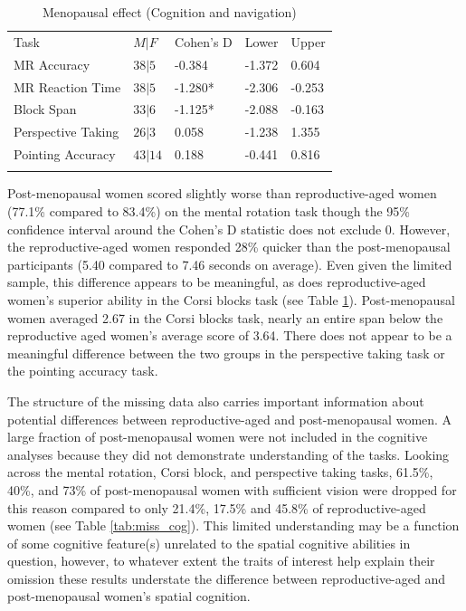 \begin{table}[h!]
\caption{Menopausal effect (Cognition and navigation)}
\label{tab:fert_cog}  
\begin{tabular}{lllll}
\hline\noalign{\smallskip}
Task & $M|F$ & Cohen's D & Lower & Upper  \\
\noalign{\smallskip}\hline\noalign{\smallskip}
MR Accuracy  & $38|5$ & -0.384 & -1.372 & \phantom{-}0.604 \\
MR Reaction Time & $38|5$ & -1.280* & -2.306 & -0.253 \\
Block Span & $33|6$ & -1.125* & -2.088 & -0.163 \\
Perspective Taking & $26|3$ & \phantom{-}0.058 & -1.238 & \phantom{-}1.355 \\
Pointing Accuracy & $43|14$ & \phantom{-}0.188 & -0.441 & \phantom{-}0.816\\
\noalign{\smallskip}\hline
\end{tabular}
\end{table}

Post-menopausal women scored slightly worse than reproductive-aged women (77.1\% compared to 83.4\%) on the mental rotation task though the 95\% confidence interval around the Cohen's D statistic does not exclude 0.  However, the reproductive-aged women responded 28\% quicker than the post-menopausal participants (5.40 compared to 7.46 seconds on average).  Even given the limited sample, this difference appears to be meaningful, as does reproductive-aged women's superior ability in the Corsi blocks task (see Table \ref{tab:fert_cog}).  Post-menopausal women averaged 2.67 in the Corsi blocks task, nearly an entire span below the reproductive aged women's average score of 3.64.  There does not appear to be a meaningful difference between the two groups in the perspective taking task or the pointing accuracy task.

The structure of the missing data also carries important information about potential differences between reproductive-aged and post-menopausal women.  A large fraction of post-menopausal women were not included in the cognitive analyses because they did not demonstrate understanding of the tasks.  Looking across the mental rotation, Corsi block, and perspective taking tasks, 61.5\%, 40\%, and 73\% of post-menopausal women with sufficient vision were dropped for this reason compared to only 21.4\%, 17.5\% and 45.8\% of reproductive-aged women (see Table \ref{tab:miss_cog}).  This limited understanding may be a function of some cognitive feature(s) unrelated to the spatial cognitive abilities in question, however, to whatever extent the traits of interest help explain their omission these results understate the difference between reproductive-aged and post-menopausal women's spatial cognition.

